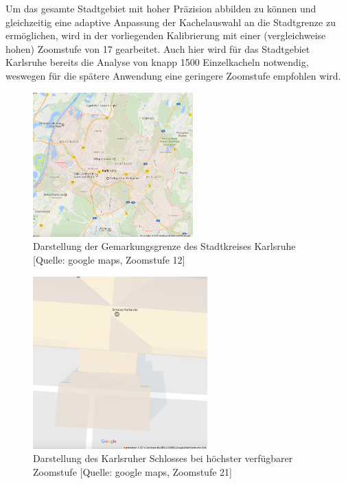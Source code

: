 Um das gesamte Stadtgebiet mit hoher Präzision abbilden zu können und gleichzeitig eine adaptive Anpassung der Kachelauswahl an die Stadtgrenze zu ermöglichen, wird in der vorliegenden Kalibrierung mit einer (vergleichweise hohen) Zoomstufe von 17 gearbeitet. Auch hier wird für das Stadtgebiet Karlsruhe bereits die Analyse von knapp 1500 Einzelkacheln notwendig, weswegen für die spätere Anwendung eine geringere Zoomstufe empfohlen wird.\\
\newline
%
\begin{figure}
  \centering
    \includegraphics[width=0.55\textwidth]{images/3_Stadtgebiet_KA_zoom12.png}
    \caption{Darstellung der Gemarkungsgrenze des Stadtkreises Karlsruhe [Quelle: google maps, Zoomstufe 12]}
    \label{fig:Stadtgebiet_KA}
\end{figure}
%
\begin{figure}
  \centering
    \includegraphics[width=0.6\textwidth]{images/3_KA_Schloss_zoom21.png}
    \caption{Darstellung des Karlsruher Schlosses bei höchster verfügbarer Zoomstufe [Quelle: google maps, Zoomstufe 21]}
    \label{fig:Schloss_KA}
\end{figure}

